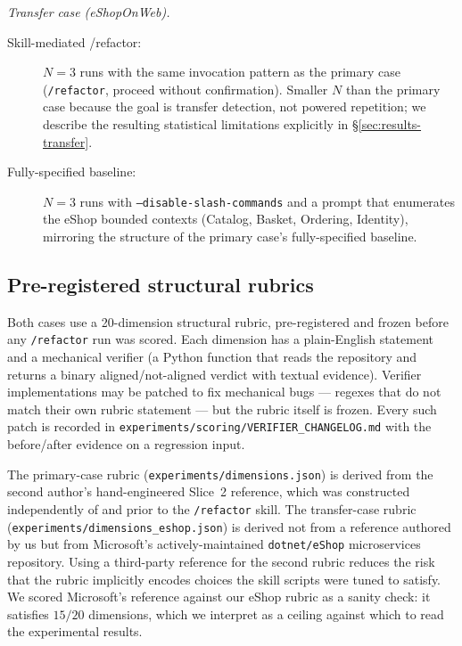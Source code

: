 \documentclass[journal]{IEEEtran}
\begin{document}
\textit{Transfer case (eShopOnWeb).}
\begin{description}
  \item[Skill-mediated /refactor:] $N=3$ runs with the same
        invocation pattern as the primary case (\texttt{/refactor},
        proceed without confirmation). Smaller $N$ than the primary
        case because the goal is transfer detection, not powered
        repetition; we describe the resulting statistical
        limitations explicitly in \S\ref{sec:results-transfer}.
  \item[Fully-specified baseline:] $N=3$ runs with
        \texttt{--disable-slash-commands} and a prompt that
        enumerates the eShop bounded contexts (Catalog, Basket,
        Ordering, Identity), mirroring the structure of the
        primary case's fully-specified baseline.
\end{description}

\subsection{Pre-registered structural rubrics}
\label{sec:method-rubrics}

Both cases use a 20-dimension structural rubric, pre-registered and
frozen before any \texttt{/refactor} run was scored. Each dimension
has a plain-English statement and a mechanical verifier (a Python
function that reads the repository and returns a binary
aligned/not-aligned verdict with textual evidence). Verifier
implementations may be patched to fix mechanical bugs --- regexes
that do not match their own rubric statement --- but the rubric
itself is frozen. Every such patch is recorded in
\texttt{experiments/scoring/VERIFIER\_CHANGELOG.md} with the
before/after evidence on a regression input.

The primary-case rubric (\texttt{experiments/dimensions.json}) is
derived from the second author's hand-engineered Slice~2 reference,
which was constructed independently of and prior to the
\texttt{/refactor} skill. The transfer-case rubric
(\texttt{experiments/dimensions\_eshop.json}) is derived not from a
reference authored by us but from Microsoft's actively-maintained
\texttt{dotnet/eShop} microservices repository. Using a third-party
reference for the second rubric reduces the risk that the rubric
implicitly encodes choices the skill scripts were tuned to satisfy.
We scored Microsoft's reference against our eShop rubric as a
sanity check: it satisfies $15/20$ dimensions, which we interpret
as a ceiling against which to read the experimental results.
\end{document}
